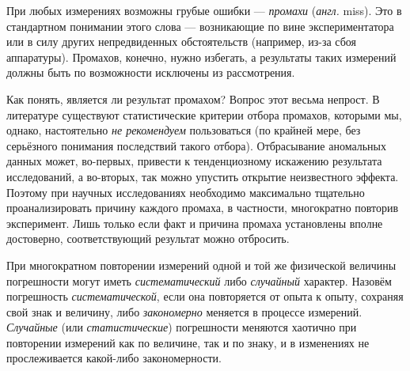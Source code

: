 При любых измерениях возможны грубые ошибки --- \emph{промахи}
(\emph{англ.} miss). Это  в стандартном
понимании этого слова --- возникающие по вине экспериментатора
или в силу других непредвиденных обстоятельств (например, из-за сбоя
аппаратуры). Промахов, конечно, нужно избегать, а результаты таких
измерений должны быть по возможности исключены из рассмотрения.


Как понять, является ли  результат промахом? Вопрос этот весьма
непрост. В литературе существуют статистические
критерии отбора промахов, которыми мы, однако, настоятельно \emph{не рекомендуем}
пользоваться (по крайней мере, без серьёзного понимания последствий
такого отбора). Отбрасывание аномальных данных может, во-первых, привести
к тенденциозному искажению результата исследований, а во-вторых, так
можно упустить открытие неизвестного эффекта. Поэтому при научных
исследованиях необходимо максимально тщательно проанализировать причину
каждого промаха, в частности, многократно повторив эксперимент. Лишь
только если факт и причина промаха установлены вполне достоверно,
соответствующий результат можно отбросить.


При многократном повторении измерений одной и той же физической величины
погрешности могут иметь \emph{систематический} либо \emph{случайный}
характер. Назовём погрешность \emph{систематической}, если она повторяется
от опыта к опыту, сохраняя свой знак и величину, либо \emph{закономерно}
меняется в процессе измерений. \emph{Случайные} (или \emph{статистические})
погрешности меняются хаотично при повторении измерений как по величине,
так и по знаку, и в изменениях не прослеживается какой-либо закономерности.

